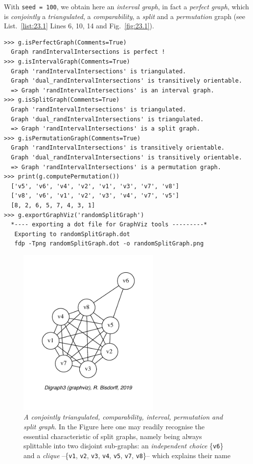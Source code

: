 With \texttt{seed = 100}, we obtain here an \emph{interval graph}, in fact a \emph{perfect graph}, which is \emph{conjointly} a \emph{triangulated}, a \emph{comparability}, a \emph{split} and a \emph{permutation} graph (see List.~\vref{list:23.1} Lines 6, 10, 14 and Fig.~\vref{fig:23.1}).
\begin{lstlisting}[caption={Testing perfect graph categories.},label=list:23.1,basicstyle=\ttfamily\scriptsize]
>>> g.isPerfectGraph(Comments=True)
  Graph randIntervalIntersections is perfect !
>>> g.isIntervalGraph(Comments=True)
  Graph 'randIntervalIntersections' is triangulated.
  Graph 'dual_randIntervalIntersections' is transitively orientable.
  => Graph 'randIntervalIntersections' is an interval graph.
>>> g.isSplitGraph(Comments=True)
  Graph 'randIntervalIntersections' is triangulated.
  Graph 'dual_randIntervalIntersections' is triangulated.
  => Graph 'randIntervalIntersections' is a split graph.
>>> g.isPermutationGraph(Comments=True)
  Graph 'randIntervalIntersections' is transitively orientable.
  Graph 'dual_randIntervalIntersections' is transitively orientable.
  => Graph 'randIntervalIntersections' is a permutation graph.
>>> print(g.computePermutation())
  ['v5', 'v6', 'v4', 'v2', 'v1', 'v3', 'v7', 'v8']
  ['v8', 'v6', 'v1', 'v2', 'v3', 'v4', 'v7', 'v5']
  [8, 2, 6, 5, 7, 4, 3, 1]
>>> g.exportGraphViz('randomSplitGraph')
  *---- exporting a dot file for GraphViz tools ---------*
   Exporting to randomSplitGraph.dot
   fdp -Tpng randomSplitGraph.dot -o randomSplitGraph.png
\end{lstlisting}
\begin{figure}[ht]
\sidecaption[t]
\includegraphics[width=7cm]{Figures/23-1-randomSplitGraph.pdf}
\caption[A conjointly triangulated, comparability, interval, permutation and split graph]{\emph{A conjointly triangulated, comparability, interval, permutation and split graph}. In the Figure here one may readily recognise the essential characteristic of split graphs, namely being always splittable into two disjoint sub-graphs: an \emph{independent choice} \{\texttt{v6}\} and a \emph{clique}  --\{\texttt{v1}, \texttt{v2}, \texttt{v3}, \texttt{v4}, \texttt{v5}, \texttt{v7}, \texttt{v8}\}-- which explains their name} 
\label{fig:23.1}       %
\end{figure}

